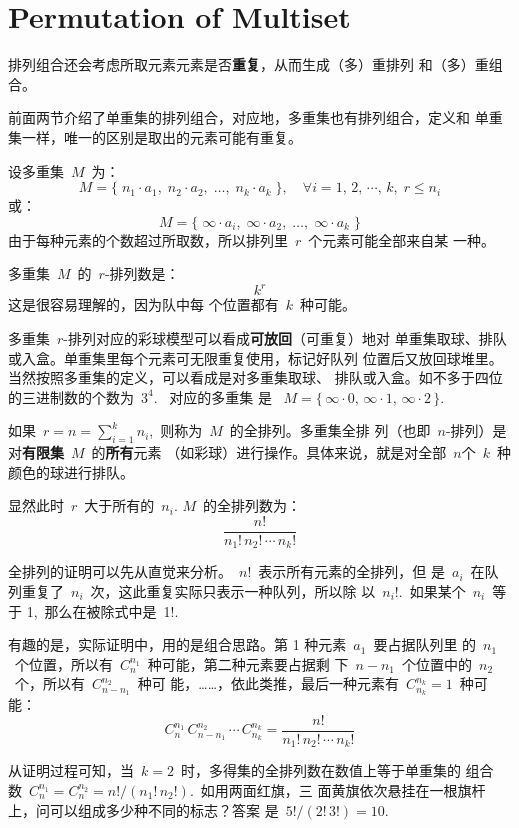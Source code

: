 \section{Permutation of Multiset}
\label{sec:permutation-multiset}

排列组合还会考虑所取元素元素是否\textbf{重复}，从而生成（多）重排列
和（多）重组合。

前面两节介绍了单重集的排列组合，对应地，多重集也有排列组合，定义和
单重集一样，唯一的区别是取出的元素可能有重复。

设多重集~$M$~为：
\[ M = \{\; n_1 \cdot a_1,\; n_2 \cdot a_2,\; \dots,\;
  n_k \cdot a_k\; \},\quad \forall i = 1,\, 2,\, \cdots,\, k,\; r
  \leq n_i \]
或：
\[ M = \{\; \infty \cdot a_i,\; \infty \cdot a_2,\; \dots,\;
  \infty \cdot a_k\; \} \]
由于每种元素的个数超过所取数，所以排列里~$r$~个元素可能全部来自某
一种。

多重集~$M$~的~$r$-排列数是：\[ k^r \] 这是很容易理解的，因为队中每
个位置都有~$k$~种可能。

多重集~$r$-排列对应的彩球模型可以看成\textbf{可放回}（可重复）地对
单重集取球、排队或入盒。单重集里每个元素可无限重复使用，标记好队列
位置后又放回球堆里。当然按照多重集的定义，可以看成是对多重集取球、
排队或入盒。如不多于四位的三进制数的个数为~$3^4$.  ~对应的多重集
是
~$M = \{\, \infty \cdot 0,\, \infty \cdot 1,\, \infty \cdot 2\,
\}$.

如果~$r = n = \sum_{i = 1}^kn_i$,~则称为~$M$~的全排列。多重集全排
列（也即~$n$-排列）是对\textbf{有限集}~$M$~的\textbf{所有}元素
（如彩球）进行操作。具体来说，就是对全部~$n$个~$k$~种颜色的球进行排队。

显然此时~$r$~大于所有的~$n_i$. $M$~的全排列数为：
\[ \frac{n!}{ n_1!\, n_2!\, \cdots\, n_k! } \]

全排列的证明可以先从直觉来分析。~$n!$~表示所有元素的全排列，但
是~$a_i$~在队列重复了~$n_i$~次，这此重复实际只表示一种队列，所以除
以~$n_i!$.~如果某个~$n_i$~等于 1,~那么在被除式中是~1!.

有趣的是，实际证明中，用的是组合思路。第 1 种元素~$a_1$~要占据队列里
的~$n_1$~个位置，所以有~$C_n^{n_1}$~种可能，第二种元素要占据剩
下~$n - n_1$~个位置中的~$n_2$~个，所以有~$C_{n - n_1}^{n_2}$~种可
能，……，依此类推，最后一种元素有~$C_{n_k}^{n_k} = 1$~种可能：
\[ C_n^{n_1}\, C_{n - n_1}^{n_2}\, \cdots\, C_{n_k}^{n_k} = \frac{n!}{ n_1!\, n_2!\, \cdots\, n_k! } \]

从证明过程可知，当~$k = 2$~时，多得集的全排列数在数值上等于单重集的
组合数~$C_n^{n_1} = C_n^{n_2} = n!/(n_1!\, n_2!)$.~如用两面红旗，三
面黄旗依次悬挂在一根旗杆上，问可以组成多少种不同的标志？答案
是~$5!/(2!\, 3!) = 10$.

